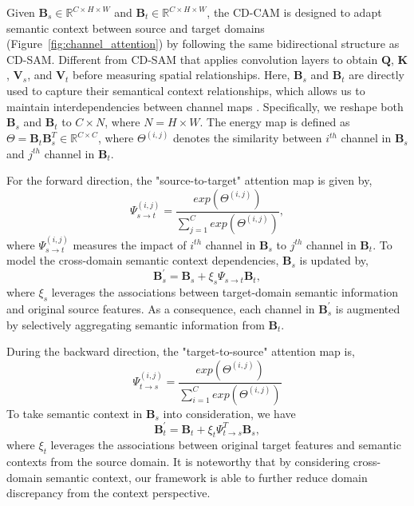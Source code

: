 \documentclass[10pt,twocolumn,letterpaper]{article}
\begin{document}
	Given $ \textbf{B}_{s}\in \mathbb{R}^{C \times H \times W} $ and $ \textbf{B}_{t} \in \mathbb{R}^{C \times H \times W} $, the CD-CAM is designed to adapt semantic context between source and target domains (Figure~\ref{fig:channel_attention}) by following the same bidirectional structure as CD-SAM. Different from CD-SAM that applies convolution layers to obtain $ \textbf{Q} $, $ \textbf{K} $, $ \textbf{V}_s $, and $ \textbf{V}_t $ before measuring spatial relationships. Here, $ \textbf{B}_{s} $ and $ \textbf{B}_{t} $ are directly used to capture their semantical context relationships, which allows us to maintain interdependencies between channel maps \cite{fu2019dual}. Specifically, we reshape both $ \textbf{B}_{s} $ and $ \textbf{B}_{t} $ to $ C \times N $, where $ N = H \times W $. The energy map is defined as $ \Theta = \textbf{B}_{t} \textbf{B}_{s}^{T} \in \mathbb{R}^{C \times C} $, where $ \Theta^{(i, j)} $ denotes the similarity between $ i^{th} $ channel in $ \textbf{B}_{s} $ and $ j^{th} $ channel in $ \textbf{B}_{t} $.

	For the forward direction, the "source-to-target" attention map is given by,
	\begin{equation}
	\Psi_{s{\rightarrow}t}^{(i, j)} = \frac{exp(\Theta^{(i, j)})}{\sum_{j=1}^{C} exp(\Theta^{(i, j)})},
	\end{equation}
	where $ \Psi_{s{\rightarrow}t}^{(i, j)} $ measures the impact of $ i^{th} $ channel in $ \textbf{B}_{s} $ to $ j^{th} $ channel in $ \textbf{B}_{t} $. To model the cross-domain semantic context dependencies, $ \textbf{B}_{s} $ is updated by,
	\begin{equation}
	\textbf{B}_{s}^{'} = \textbf{B}_{s} + \xi_{s} \Psi_{s{\rightarrow}t} \textbf{B}_{t},
	\end{equation}
	where $ \xi_{s} $ leverages the associations between target-domain semantic information and original source features. As a consequence, each channel in $ \textbf{B}_{s}^{'} $ is augmented by selectively aggregating semantic information from $ \textbf{B}_{t} $.

	During the backward direction, the "target-to-source" attention map is,
	\begin{equation}
	\Psi_{t{\rightarrow}s}^{(i, j)} = \frac{exp(\Theta^{(i, j)})}{\sum_{i=1}^{C} exp(\Theta^{(i, j)})}
	\end{equation}
	To take semantic context in $ \textbf{B}_{s} $ into consideration, we have
	\begin{equation}
	\textbf{B}_{t}^{'} = \textbf{B}_{t} + \xi_{t} \Psi_{t{\rightarrow}s}^T \textbf{B}_{s},
	\end{equation}
	where $ \xi_{t} $ leverages the associations between original target features and semantic contexts from the source domain. It is noteworthy that by considering cross-domain semantic context, our framework is able to further reduce domain discrepancy from the context perspective.
\end{document}
